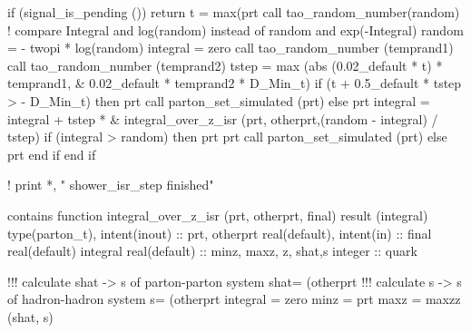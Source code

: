     if (signal_is_pending ()) return
    t = max(prt%
    call tao_random_number(random)
    ! compare Integral and log(random) instead of random and exp(-Integral)
    random = - twopi * log(random)
    integral = zero
    call tao_random_number (temprand1)
    call tao_random_number (temprand2)
    tstep = max (abs (0.02_default * t) * temprand1, &
         0.02_default * temprand2 * D_Min_t)
    if (t + 0.5_default * tstep > - D_Min_t) then
       prt%
       call parton_set_simulated (prt)
    else
       prt%
       integral = integral + tstep * &
            integral_over_z_isr (prt, otherprt,(random - integral) / tstep)
       if (integral > random) then
          prt%
          prt%
          call parton_set_simulated (prt)
       else
          prt%
       end if
    end if

    ! print *, "  shower_isr_step finished"

  contains
    function integral_over_z_isr (prt, otherprt, final) result (integral)
      type(parton_t), intent(inout) :: prt, otherprt
      real(default), intent(in) :: final
      real(default) integral
      real(default) :: minz, maxz, z, shat,s
      integer :: quark

      !!! calculate shat -> s of parton-parton system
      shat= (otherprt%
      !!! calculate s -> s of hadron-hadron system
      s= (otherprt%
      integral = zero
      minz = prt%
      maxz = maxzz (shat, s)

